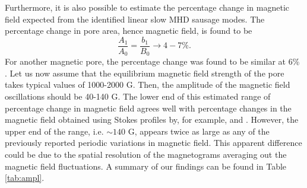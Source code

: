     Furthermore, it is also possible to estimate the percentage change in magnetic field expected from the identified linear slow MHD sausage modes.
    The percentage change in pore area, hence magnetic field, is found to be $$\frac{A_1}{A_0} = \frac{b_1}{B_0} \rightarrow 4-7\%.$$
   	For another magnetic pore, the percentage change was found to be similar at 6\% \citep{0004-637X-806-1-132}.
    Let us now assume that the equilibrium magnetic field strength of the pore takes typical values of 1000-2000 G.
    Then, the amplitude of the magnetic field oscillations should be 40-140 G.
    The lower end of this estimated range of percentage change in magnetic field agrees well with percentage changes in the magnetic field obtained using Stokes profiles by, for example, \citet{Balthasar2000} and \citet{PMHDW}.
    However, the upper end of the range, i.e. $\sim 140$ G, appears twice as large as any of the previously reported periodic variations in magnetic field. 
    This apparent difference could be due to the spatial resolution of the magnetograms averaging out the magnetic field fluctuations.
    A summary of our findings can be found in Table \ref{tab:ampl}.
    
